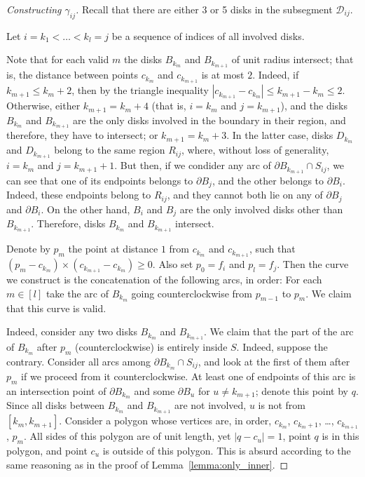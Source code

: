 \begin{proof}[Constructing $\gamma_{ij}$]
Recall that there are either 3 or 5 disks in the subsegment $\mathcal{D}_{ij}$.

Let $i = k_1 < \ldots < k_l = j$ be a sequence of indices of all involved disks. %

Note that for each valid $m$ the disks $B_{k_m}$ and $B_{k_{m+1}}$ of unit radius intersect; that is, the distance between points $c_{k_m}$ and $c_{k_{m+1}}$ is at most $2$. Indeed, if $k_{m+1}\leq k_m + 2$, then by the triangle inequality $|c_{k_{m+1}} - c_{k_m}|\leq k_{m+1}-k_m\leq 2$. Otherwise, either $k_{m+1} = k_m + 4$ (that is, $i = k_m$ and $j = k_{m+1}$), and the disks $B_{k_m}$ and $B_{k_{m+1}}$ are the only disks involved in the boundary in their region, and therefore, they have to intersect; or $k_{m+1} = k_m + 3$. In the latter case, disks $D_{k_m}$ and $D_{k_{m+1}}$ belong to the same region $R_{ij}$, where, without loss of generality, $i = k_m$ and $j = k_{m+1} + 1$. But then, if we condider any arc of $\partial B_{k_{m+1}}\cap S_{ij}$, we can see that one of its endpoints belongs to $\partial B_j$, and the other belongs to $\partial B_i$. Indeed, these endpoints belong to $R_{ij}$, and they cannot both lie on any of $\partial{B_j}$ and $\partial{B_i}$. On the other hand, $B_i$ and $B_j$ are the only involved disks other than $B_{k_{m+1}}$. Therefore, disks $B_{k_m}$ and $B_{k_{m+1}}$ intersect.

Denote by $p_m$ the point at distance $1$ from $c_{k_m}$ and $c_{k_{m+1}}$, such that $(p_m - c_{k_m})\times(c_{k_{m+1}} - c_{k_m})\geq 0$. Also set $p_0 = f_i$ and $p_l = f_j$. Then the curve we construct is the concatenation of the following arcs, in order: For each $m\in[l]$ take the arc of $B_{k_m}$ going counterclockwise from $p_{m-1}$ to $p_m$. We claim that this curve is valid.

Indeed, consider any two disks $B_{k_m}$ and $B_{k_{m+1}}$. We claim that the part of the arc of $B_{k_m}$ after $p_m$ (counterclockwise) is entirely inside $S$. Indeed, suppose the contrary.
Consider all arcs among $\partial{B_{k_m}}\cap S_{ij}$, and look at the first of them after $p_m$ if we proceed from it counterclockwise. At least one of endpoints of this arc is an intersection point of $\partial{B_{k_m}}$ and some $\partial{B_u}$ for $u\neq k_{m+1}$; denote this point by $q$.
Since all disks between $B_{k_m}$ and $B_{k_{m+1}}$ are not involved, $u$ is not from $[k_m, k_{m+1}]$. Consider a polygon whose vertices are, in order, $c_{k_m}$, $c_{k_m + 1}$, \ldots, $c_{k_{m+1}}$, $p_m$. All sides of this polygon are of unit length, yet $|q - c_u| = 1$, point $q$ is in this polygon, and point $c_u$ is outside of this polygon. This is absurd according to the same reasoning as in the proof of Lemma~\ref{lemma:only_inner}.

\end{proof}


